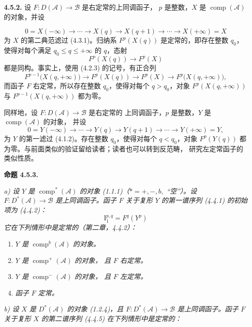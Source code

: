 \clearpage
{}%
\begingroup\small\setlength{\parskip}{0pt}\setlength{\emergencystretch}{1.5em}
\setlength{\abovedisplayskip}{4pt plus 2pt minus 2pt}%
\setlength{\belowdisplayskip}{4pt plus 2pt minus 2pt}%

\noindent\textbf{4.5.2.}\quad
设 $F\colon D(\mathcal A)\longrightarrow\mathcal B$ 是右定常的上同调函子，
$p$ 是整数，$X$ 是 $\operatorname{comp}(\mathcal A)$ 的对象，并设

\[
0=X(-\infty)\longrightarrow\cdots\longrightarrow X(q)
\longrightarrow X(q+1)\longrightarrow\cdots
\longrightarrow X(+\infty)=X
\]
为 $X$ 的第二典范滤过 (4.3.1)。归纳系 $F^p(X(q))$ 是定常的，即存在整数
$q_0$，使得对每个满足 $q_0\leq q\leq+\infty$ 的 $q$，态射
\[
F^p(X(q))\longrightarrow F^p(X)
\]
都是同构。事实上，使用 (4.2.3) 的记号，有正合列
\[
F^{p-1}\bigl(X(q,+\infty)\bigr)\longrightarrow F^p(X(q))
\longrightarrow F^p(X)\longrightarrow F^p\bigl(X(q,+\infty)\bigr),
\]
而函子 $F$ 右定常，所以存在整数 $q_0$，使得对每个 $q>q_0$，对象
$F^p(X(q,+\infty))$ 与 $F^{p-1}(X(q,+\infty))$ 都为零。

同样地，设 $F\colon D(\mathcal A)\longrightarrow\mathcal B$ 是右定常的
上同调函子，$p$ 是整数，$Y$ 是 $\operatorname{comp}(\mathcal A)$ 的对象，
并设
\[
0=Y(-\infty)\longrightarrow\cdots\longrightarrow Y(q)
\longrightarrow Y(q+1)\longrightarrow\cdots
\longrightarrow Y(+\infty)=Y,
\]
为 $Y$ 的第一滤过 (4.1.2)。存在整数 $q_0$，使得对每个 $q<q_0$，对象
$F^p(Y(q))$ 都为零。与前面类似的验证留给读者；读者也可以转到反范畴，
研究左定常函子的类似性质。

\medskip\noindent\textbf{命题 4.5.3.}\quad

\noindent\textit{a) 设 $Y$ 是 $\operatorname{comp}^{*}(\mathcal A)$ 的对象
(1.1.1)（$*=+,-,b,{}$ ``空''）。设
$F\colon D^*(\mathcal A)\longrightarrow\mathcal B$ 是上同调函子。函子
$F$ 关于复形 $Y$ 的第一谱序列 (4.4.1) 的初始项为 (4.4.2)：}
\[
\textit{$\mathrm{I}_1^{p,q}=F^q(Y^p)$}
\]
\textit{它在下列情形中是定常的（第二章，4.4.2）：}

\begin{enumerate}
\item[1)] \textit{$Y$ 是 $\operatorname{comp}^{b}(\mathcal A)$ 的对象。}
\item[2)] \textit{$Y$ 是 $\operatorname{comp}^{+}(\mathcal A)$ 的对象，
且 $F$ 右定常。}
\item[3)] \textit{$Y$ 是 $\operatorname{comp}^{-}(\mathcal A)$ 的对象，
且 $F$ 左定常。}
\item[4)] \textit{函子 $F$ 定常。}
\end{enumerate}

\noindent\textit{b) 设 $X$ 是 $D^*(\mathcal A)$ 的对象 (1.2.4)，且
$F\colon D^*(\mathcal A)\longrightarrow\mathcal B$ 是上同调函子。函子
$F$ 关于复形 $X$ 的第二谱序列 (4.4.5) 在下列情形中是定常的：}
\endgroup
